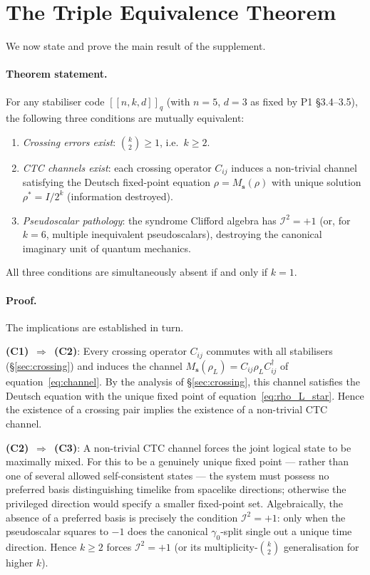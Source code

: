 \documentclass[11pt,a4paper]{article}
\newcommand{\Cq}[4]{[\![#1,#2,#3]\!]_{#4}}
\newcommand{\Ms}{M_{\mathbf{s}}}
\begin{document}
\section{The Triple Equivalence Theorem}
\label{sec:triple}

We now state and prove the main result of the supplement.

\paragraph{Theorem statement.}
For any stabiliser code $\Cq{n}{k}{d}{q}$ (with $n=5$, $d=3$ as fixed by P1 \S3.4--3.5), the following three conditions are mutually equivalent:
\begin{enumerate}\setlength\itemsep{2pt}
  \item[\textbf{(C1)}] \emph{Crossing errors exist}: $\binom{k}{2}\geq 1$, i.e.\ $k\geq2$.
  \item[\textbf{(C2)}] \emph{CTC channels exist}: each crossing operator $C_{ij}$ induces a non-trivial channel satisfying the Deutsch fixed-point equation $\rho=\Ms(\rho)$ with unique solution $\rho^*=I/2^k$ (information destroyed).
  \item[\textbf{(C3)}] \emph{Pseudoscalar pathology}: the syndrome Clifford algebra has $\mathcal{I}^2=+1$ (or, for $k=6$, multiple inequivalent pseudoscalars), destroying the canonical imaginary unit of quantum mechanics.
\end{enumerate}
All three conditions are simultaneously absent if and only if $k=1$.

\paragraph{Proof.}
The implications are established in turn.

\textbf{(C1)}~$\Rightarrow$~\textbf{(C2)}: Every crossing operator $C_{ij}$ commutes with all stabilisers (\S\ref{sec:crossing}) and induces the channel $\Ms(\rho_L) = C_{ij}\rho_L C_{ij}^{\dagger}$ of equation~\eqref{eq:channel}. By the analysis of \S\ref{sec:crossing}, this channel satisfies the Deutsch equation with the unique fixed point of equation~\eqref{eq:rho_L_star}. Hence the existence of a crossing pair implies the existence of a non-trivial CTC channel.

\textbf{(C2)}~$\Rightarrow$~\textbf{(C3)}: A non-trivial CTC channel forces the joint logical state to be maximally mixed. For this to be a genuinely unique fixed point --- rather than one of several allowed self-consistent states --- the system must possess no preferred basis distinguishing timelike from spacelike directions; otherwise the privileged direction would specify a smaller fixed-point set. Algebraically, the absence of a preferred basis is precisely the condition $\mathcal{I}^2=+1$: only when the pseudoscalar squares to $-1$ does the canonical $\gamma_0$-split single out a unique time direction. Hence $k\geq2$ forces $\mathcal{I}^2=+1$ (or its multiplicity-$\binom{k}{2}$ generalisation for higher $k$).
\end{document}
